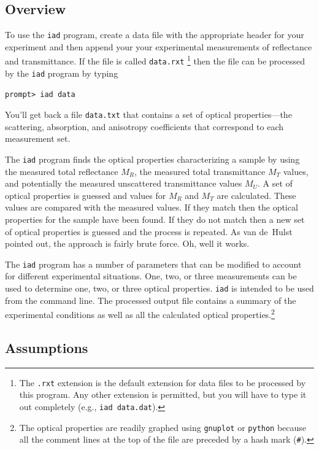 \documentclass{article}
\newcommand\iadprog{\texttt{iad}}
\begin{document}
\subsection{Overview}
To use the \iadprog{} program, create a data file with
the appropriate header for your experiment and then append your your
experimental measurements of reflectance and transmittance.  If the file is
called \texttt{data.rxt}%
\footnote{The \texttt{.rxt} extension is the default extension
for data files to be processed by this program.  Any other extension is permitted,
but you will have to type it out completely (e.g., \texttt{iad data.dat}).} 
then the file can be processed by the \iadprog{} program by typing
\begin{center}
\texttt{prompt> iad data}
\end{center}
You'll get back a file \texttt{data.txt}
that contains a set of optical properties---the scattering, absorption, and
anisotropy coefficients that correspond to each measurement set.   

The \iadprog{} program finds the optical properties characterizing a sample by using
the measured total reflectance $M_R$, the measured total transmittance $M_T$ values,
and potentially the measured unscattered transmittance values $M_U$.  
A set of optical properties is guessed
and values for $M_R$ and $M_T$ are calculated.  These values are compared
with the measured values.  If they match then the
optical properties for the sample have been found.  If they do not match then a
new set of optical properties is guessed and the process is repeated. As van
de~Hulst pointed out, the approach is fairly brute force.  Oh, well it works.

The \iadprog{} program has a number of parameters that can be modified to 
account for
different experimental situations.  One, two, or three measurements can be used 
to determine one, two, or
three optical properties.  \iadprog{} is intended to be used from the command line.  
The processed output file
contains a summary of the experimental conditions as well as all the 
calculated optical properties.\footnote{The optical properties are readily graphed using 
\texttt{gnuplot} or \texttt{python} because all the comment lines at the
top of the file are preceded by a hash mark (\texttt{\#}).}

\subsection{Assumptions}
\end{document}

